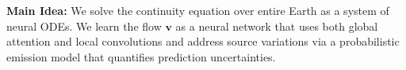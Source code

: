\documentclass[landscape,a0paper,fontscale=0.292]{baposter}
\begin{document}
\begin{poster}
{    %

    \textbf{\color{blue}Main Idea:} We solve the continuity equation over entire Earth as a system of neural ODEs. We learn the flow $\mathbf{v}$ as a neural network that uses both global attention and local convolutions and address source variations via a probabilistic emission model that quantifies prediction uncertainties.
}

\end{poster}
\end{document}

